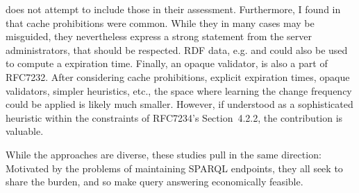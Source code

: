 does not attempt to include those in their assessment. Furthermore, I
found in \cite{kjernsmo_survey_2015} that cache prohibitions were
common. While they in many cases may be misguided, they nevertheless
express a strong statement from the server administrators, that should
be respected. RDF data, e.g.  and
 could also be used to compute a expiration
time. Finally, an opaque validator,  is also a part of
RFC7232. After considering cache prohibitions, explicit expiration
times, opaque validators, simpler heuristics, etc., the space where
learning the change frequency could be applied is likely much
smaller. However, if understood as a sophisticated heuristic within
the constraints of RFC7234's Section~4.2.2, the contribution is
valuable.



While the approaches are diverse, these studies pull in the same
direction: Motivated by the problems of maintaining SPARQL endpoints,
they all seek to share the burden, and so make query answering
economically feasible.



